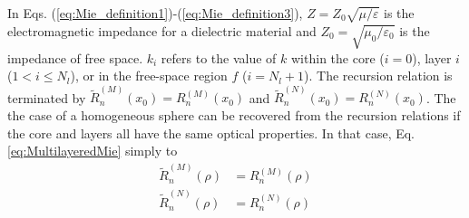 In Eqs. (\ref{eq:Mie_definition1})-(\ref{eq:Mie_definition3}), $Z=Z_0 \sqrt{\mu/\varepsilon}$ is the electromagnetic impedance for a dielectric material and $Z_0=\sqrt{\mu_0/\varepsilon_0}$ is the impedance of free space. $k_{i}$ refers to the value of $k$ within the core ($i=0$), layer $i$ ($1<i\le N_{l}$), or in the free-space region $f$ ($i=N_{l}+1$). The recursion relation is terminated by $\widetilde{R}_{n}^{(M)}(x_{0}) = R_{n}^{(M)}(x_{0})$ and $\widetilde{R}_{n}^{(N)}(x_{0}) = R_{n}^{(N)}(x_{0})$. The the case of a homogeneous sphere can be recovered from the recursion relations if the core and layers all have the same optical properties. In that case, Eq. \ref{eq:MultilayeredMie} simply to
%
\begin{subequations}
\begin{align}
\widetilde{R}_{n}^{(M)}(\rho) &= R_{n}^{(M)}(\rho)
\\
\widetilde{R}_{n}^{(N)}(\rho) &= R_{n}^{(N)}(\rho)
\end{align}
\end{subequations}